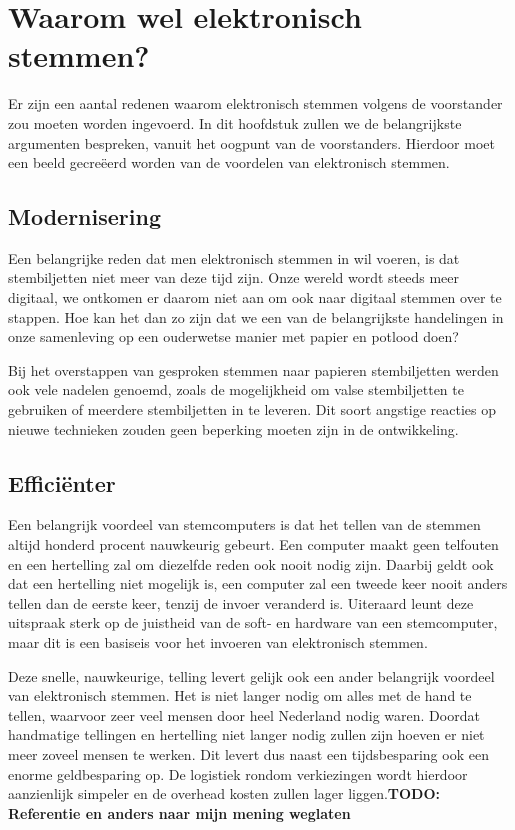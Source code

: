 \documentclass[a4paper]{article}
\newcommand{\TODO}[1]{{\color{red}\textbf{TODO: #1}}}
\begin{document}
\newpage

\section{Waarom wel elektronisch stemmen?}
\label{text:voor}
Er zijn een aantal redenen waarom elektronisch stemmen volgens de voorstander zou moeten worden ingevoerd.
In dit hoofdstuk zullen we de belangrijkste argumenten bespreken, vanuit het oogpunt van de voorstanders.
Hierdoor moet een beeld gecre{\"e}erd worden van de voordelen van elektronisch stemmen.

\subsection{Modernisering}
Een belangrijke reden dat men elektronisch stemmen in wil voeren, is dat stembiljetten niet meer van deze tijd zijn.
Onze wereld wordt steeds meer digitaal, we ontkomen er daarom niet aan om ook naar digitaal stemmen over te stappen.
Hoe kan het dan zo zijn dat we een van de belangrijkste handelingen in onze samenleving op een ouderwetse manier met papier en potlood doen?

Bij het overstappen van gesproken stemmen naar papieren stembiljetten werden ook vele nadelen genoemd, zoals de mogelijkheid om valse stembiljetten te gebruiken of meerdere stembiljetten in te leveren.
Dit soort angstige reacties op nieuwe technieken zouden geen beperking moeten zijn in de ontwikkeling.

\subsection{Effici{\"e}nter}
Een belangrijk voordeel van stemcomputers is dat het tellen van de stemmen altijd honderd procent nauwkeurig gebeurt.
Een computer maakt geen telfouten en een hertelling zal om diezelfde reden ook nooit nodig zijn.
Daarbij geldt ook dat een hertelling niet mogelijk is, een computer zal een tweede keer nooit anders tellen dan de eerste keer, tenzij de invoer veranderd is.
Uiteraard leunt deze uitspraak sterk op de juistheid van de soft- en hardware van een stemcomputer, maar dit is een basiseis voor het invoeren van elektronisch stemmen.

Deze snelle, nauwkeurige, telling levert gelijk ook een ander belangrijk voordeel van elektronisch stemmen.
Het is niet langer nodig om alles met de hand te tellen, waarvoor zeer veel mensen door heel Nederland nodig waren.
Doordat handmatige tellingen en hertelling niet langer nodig zullen zijn hoeven er niet meer zoveel mensen te werken.
Dit levert dus naast een tijdsbesparing ook een enorme geldbesparing op.
De logistiek rondom verkiezingen wordt hierdoor aanzienlijk simpeler en de overhead kosten zullen lager liggen.\TODO{Referentie en anders naar mijn mening weglaten}
\end{document}
